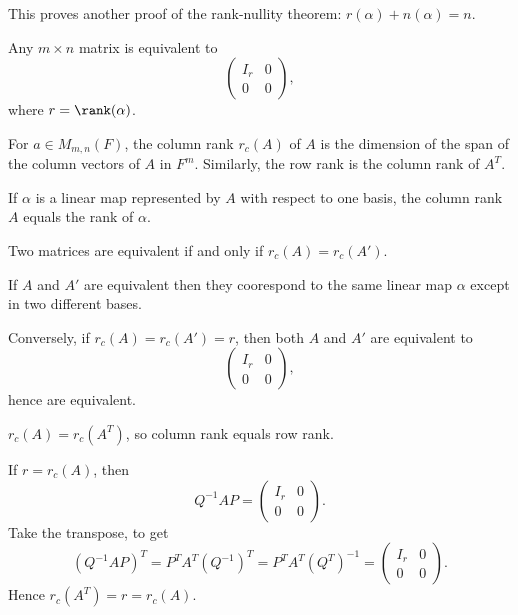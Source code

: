 \documentclass[12pt]{article}
\begin{document}
\begin{remark}
	This proves another proof of the rank-nullity theorem: $r(\alpha) + n(\alpha) = n$.
\end{remark}

\begin{corollary}
	Any $m \times n$ matrix is equivalent to
	\[
	\begin{pmatrix}
		I_r & 0 \\
		0 & 0
	\end{pmatrix}
	,\]
	where $r = \rank(\alpha)$.
\end{corollary}

\begin{definition}
	For $a \in M_{m, n}(F)$, the column rank $r_c(A)$ of $A$ is the dimension of the span of the column vectors of $A$ in $F^{m}$. Similarly, the row rank is the column rank of $A^{T}$.
\end{definition}

\begin{remark}
	If $\alpha$ is a linear map represented by $A$ with respect to one basis, the column rank $A$ equals the rank of $\alpha$.
\end{remark}

\begin{proposition}
	Two matrices are equivalent if and only if $r_c(A) = r_c(A')$.
\end{proposition}

\begin{proofbox}
	If $A$ and $A'$ are equivalent then they coorespond to the same linear map $\alpha$ except in two different bases.

Conversely, if $r_c(A) = r_c(A') = r$, then both $A$ and $A'$ are equivalent to
\[
\begin{pmatrix}
	I_r & 0 \\
	0 & 0
\end{pmatrix}
,\]
hence are equivalent.
\end{proofbox}

\begin{theorem}
	$r_c(A) = r_c(A^{T})$, so column rank equals row rank.
\end{theorem}

\begin{proofbox}
	If $r = r_c(A)$, then
	\[
	Q^{-1}AP =
	\begin{pmatrix}
		I_r & 0 \\
		0 & 0
	\end{pmatrix}
	.\]
	Take the transpose, to get
	\[
		(Q^{-1}AP)^{T} = P^{T}A^{T}(Q^{-1})^{T} = P^{T}A^{T}(Q^{T})^{-1} =
		\begin{pmatrix}
			I_r & 0 \\
			0 & 0
		\end{pmatrix}
	.\]
	Hence $r_c(A^{T}) = r = r_c(A)$.
\end{proofbox}
\end{document}
